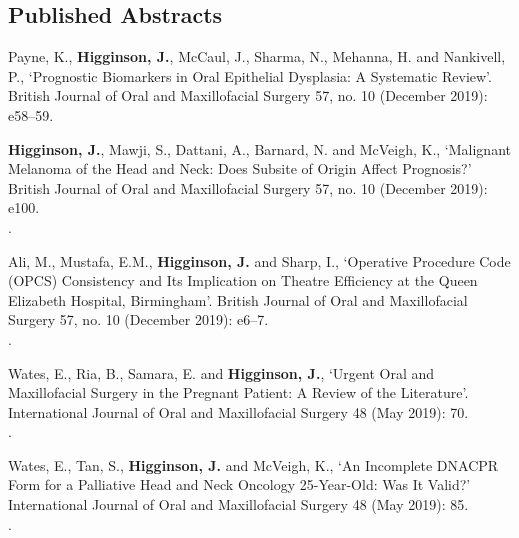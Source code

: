 \subsection*{Published Abstracts}

 Payne, K., \textbf{Higginson, J.}, McCaul, J., Sharma, N., Mehanna, H. and Nankivell, P., `Prognostic Biomarkers in Oral Epithelial Dysplasia: A Systematic Review’. British Journal of Oral and Maxillofacial Surgery 57, no. 10 (December 2019): e58–59. 
\\

\vspace{0.1cm}

 \textbf{Higginson, J.}, Mawji, S., Dattani, A., Barnard, N. and McVeigh, K., `Malignant Melanoma of the Head and Neck: Does Subsite of Origin Affect Prognosis?’ British Journal of Oral and Maxillofacial Surgery 57, no. 10 (December 2019): e100. 
\\.

\vspace{0.1cm}

 Ali, M., Mustafa, E.M., \textbf{Higginson, J.} and Sharp, I., `Operative Procedure Code (OPCS) Consistency and Its Implication on Theatre Efficiency at the Queen Elizabeth Hospital, Birmingham’. British Journal of Oral and Maxillofacial Surgery 57, no. 10 (December 2019): e6–7. 
\\.

\vspace{0.1cm}

 Wates, E., Ria, B., Samara, E. and \textbf{Higginson, J.}, `Urgent Oral and Maxillofacial Surgery in the Pregnant Patient: A Review of the Literature’. International Journal of Oral and Maxillofacial Surgery 48 (May 2019): 70. 
\\.

\vspace{0.1cm}

 Wates, E., Tan, S., \textbf{Higginson, J.} and McVeigh, K., `An Incomplete DNACPR Form for a Palliative Head and Neck Oncology 25-Year-Old: Was It Valid?’ International Journal of Oral and Maxillofacial Surgery 48 (May 2019): 85. 
\\.

\vspace{0.1cm}

